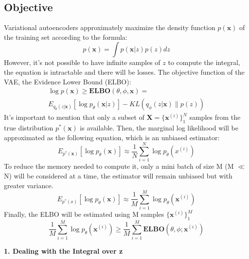 \documentclass[5p,sort&compress]{elsarticle}
\begin{document}
\subsection{Objective}
Variational autoencoders approximately maximize the density function $p(\boldsymbol{x})$ of the training set according to the formula:
\begin{equation}
p(\boldsymbol{x})=\int p(\boldsymbol{x} | z) p(z) d z
\end{equation}
However, it's not possible to have infinite samples of $z$ to compute the integral, the equation is intractable and there will be losses.  The objective function of the VAE, the Evidence Lower Bound (ELBO):
\begin{equation}
\begin{aligned}
\log p(\boldsymbol{x}) \geq \boldsymbol{E} \boldsymbol{L B O}(\theta, \phi, \boldsymbol{x})= \\ E_{q_{\theta}(z | \mathbf{x})}\left[\log p_{\theta}(\boldsymbol{x} | z)\right]-K L\left(q_{\phi}(z | \boldsymbol{x}) \| p(z)\right)
\end{aligned}
\end{equation}
It's important to mention that only a subset of $\mathbf{X}=\{\mathbf{x}^{(i)}\}_1^N$ samples from the true distribution $p^*(\boldsymbol{x})$ is available. Then, the marginal log likelihood will be approximated as the following equation, which is an unbiased estimator:
\begin{equation}
E_{p^{*}(\boldsymbol{x})}\left[\log p_{\theta}(\boldsymbol{x})\right] \approx \frac{1}{N} \sum_{i=1}^{N} \log p_{\theta}(x^{(i)})
\end{equation}
To reduce the memory needed to compute it, only a mini batch of size M (M $\ll$ N) will be considered at a time, the estimator will remain unbiased but with greater variance.
\begin{equation}
E_{p^{*}(x)}\left[\log p_{\theta}(\boldsymbol{x})\right] \approx \frac{1}{M} \sum_{i=1}^{M} \log p_{\theta}(\boldsymbol{x}^{(i)})
\end{equation}
Finally, the ELBO will be estimated using M samples $\{\mathbf{x}^{(i)}\}_1^M$
\begin{equation}
\frac{1}{M} \sum_{i=1}^{M} \log p_{\theta}\left(\boldsymbol{x}^{(i)}\right) \geq \frac{1}{M} \sum_{i=1}^{M} \boldsymbol{E} \boldsymbol{L} \boldsymbol{B} \boldsymbol{O}(\theta, \phi ; \boldsymbol{x}^{(i)})
\end{equation}

\textbf{1. Dealing with the Integral over z}
\end{document}
